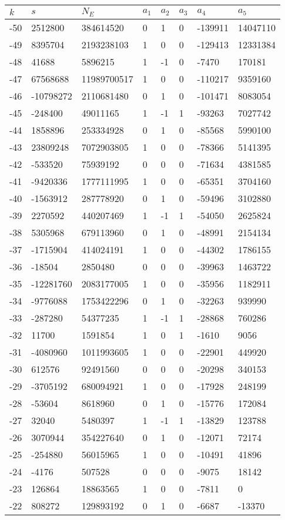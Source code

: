 \documentclass{amsart}
\begin{document}
\begin{longtable}{|l|l|l|lllll|}
\hline
$k$ & $s$ & $N_E$ & $a_1$ & $a_2$ & $a_3$ & $a_4$ & $a_5$\\
\hline
-50&2512800&384614520&0&1&0&-139911&14047110\\
-49&8395704&2193238103&1&0&0&-129413&12331384\\
-48&41688&5896215&1&-1&0&-7470&170181\\
-47&67568688&11989700517&1&0&0&-110217&9359160\\
-46&-10798272&2110681480&0&1&0&-101471&8083054\\
-45&-248400&49011165&1&-1&1&-93263&7027742\\
-44&1858896&253334928&0&1&0&-85568&5990100\\
-43&23809248&7072903805&1&0&0&-78366&5141395\\
-42&-533520&75939192&0&0&0&-71634&4381585\\
-41&-9420336&1777111995&1&0&0&-65351&3704160\\
-40&-1563912&287778920&0&1&0&-59496&3102880\\
-39&2270592&440207469&1&-1&1&-54050&2625824\\
-38&5305968&679113960&0&1&0&-48991&2154134\\
-37&-1715904&414024191&1&0&0&-44302&1786155\\
-36&-18504&2850480&0&0&0&-39963&1463722\\
-35&-12281760&2083177005&1&0&0&-35956&1182911\\
-34&-9776088&1753422296&0&1&0&-32263&939990\\
-33&-287280&54377235&1&-1&1&-28868&760286\\
-32&11700&1591854&1&0&1&-1610&9056\\
-31&-4080960&1011993605&1&0&0&-22901&449920\\
-30&612576&92491560&0&0&0&-20298&340153\\
-29&-3705192&680094921&1&0&0&-17928&248199\\
-28&-53604&8618960&0&1&0&-15776&172084\\
-27&32040&5480397&1&-1&1&-13829&123788\\
-26&3070944&354227640&0&1&0&-12071&72174\\
-25&-254880&56015965&1&0&0&-10491&41896\\
-24&-4176&507528&0&0&0&-9075&18142\\
-23&126864&18863565&1&0&0&-7811&0\\
-22&808272&129893192&0&1&0&-6687&-13370\\

\end{longtable}
\end{document}
